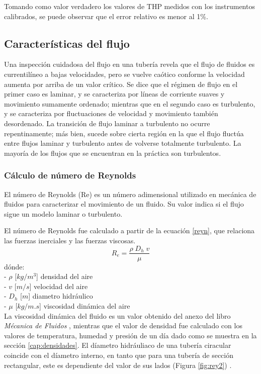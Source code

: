 Tomando como valor verdadero los valores de THP medidos con los instrumentos calibrados, se puede observar que el error relativo es menor al 1\%.


\subsection{Características del flujo}
Una inspección cuidadosa del flujo en una tubería revela que el flujo de fluidos es currentilíneo a bajas velocidades, pero se vuelve
caótico conforme la velocidad aumenta por arriba de un valor crítico. Se dice que el régimen de flujo en el primer caso es laminar, y se caracteriza por líneas de corriente suaves y movimiento sumamente
ordenado; mientras que en el segundo caso es turbulento, y se caracteriza por
fluctuaciones de velocidad y movimiento también desordenado. La transición
de flujo laminar a turbulento no ocurre repentinamente; más bien, sucede sobre
cierta región en la que el flujo fluctúa entre flujos laminar y turbulento antes de
volverse totalmente turbulento. La mayoría de los flujos que se encuentran en la
práctica son turbulentos. 

\subsubsection{Cálculo de número de Reynolds}
\begin{tcolorbox}[colback=blue!5!white,colframe=blue!75!black,title=Número de Reynolds]
	El número de Reynolds (Re) es un número adimensional utilizado en mecánica de fluidos para caracterizar el movimiento de un fluido. Su valor indica si el flujo sigue un modelo laminar o turbulento.
\end{tcolorbox}
	El número de Reynolds fue calculado a partir de la ecuación \ref{reyn}, que relaciona las fuerzas inerciales y las fuerzas viscosas. 
\begin{equation}	
	R_e=\frac{\rho\;D_h\;v}\mu
	\label{reyn}
\end{equation}	
dónde:\\
- \textbf{$\rho$ } [$kg/m^{3}$] densidad del aire \\
- \textbf{$v$ } [$m/s$] velocidad del aire\\
- \textbf{$D_h$ } [$m$] diametro hidráulico\\
- \textbf{$\mu$ } [$kg/m.s$] viscosidad dinámica del aire\\


La viscosidad dinámica del fluido es un valor obtenido del anexo del libro \textit{Mécanica de Fluidos} \cite{yunus2006mecanica}, mientras que el valor de densidad fue calculado con los valores de temperatura, humedad y presión de un día dado como se muestra en la sección \ref{cap:densidades}.
El díametro hidráuliaco de una tubería ciracular coincide con el díametro interno, en tanto que para una tubería de sección rectangular, este es dependiente del valor de sus lados (Figura \ref{fig:rey2}) \cite{licci2020estudio}.

